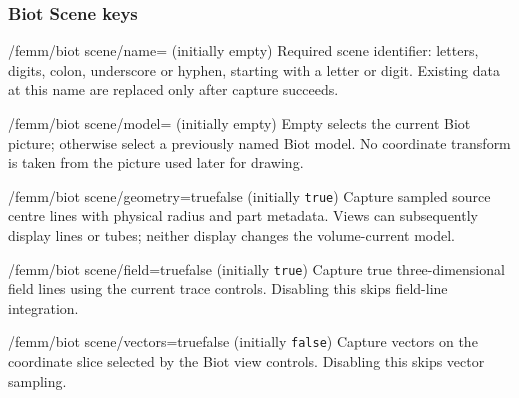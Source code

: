 \subsubsection{Biot Scene keys}
\begin{key}{/femm/biot scene/name= (initially empty)}
Required scene identifier: letters, digits, colon, underscore or hyphen, starting with a letter or digit. Existing data at this name are replaced only after capture succeeds.
\end{key}
\begin{key}{/femm/biot scene/model= (initially empty)}
Empty selects the current Biot picture; otherwise select a previously named Biot model. No coordinate transform is taken from the picture used later for drawing.
\end{key}
\begin{key}{/femm/biot scene/geometry=true\textbar false (initially \texttt{true})}
Capture sampled source centre lines with physical radius and part metadata. Views can subsequently display lines or tubes; neither display changes the volume-current model.
\end{key}
\begin{key}{/femm/biot scene/field=true\textbar false (initially \texttt{true})}
Capture true three-dimensional field lines using the current trace controls. Disabling this skips field-line integration.
\end{key}
\begin{key}{/femm/biot scene/vectors=true\textbar false (initially \texttt{false})}
Capture vectors on the coordinate slice selected by the Biot view controls. Disabling this skips vector sampling.
\end{key}

